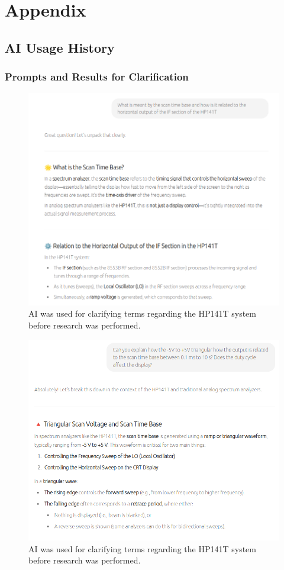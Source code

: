 \documentclass[class=report,11pt,crop=false]{standalone}
\begin{document}
	\chapter{Appendix}

	\section{AI Usage History}
	
	\subsection{Prompts and Results for Clarification}
	
	\begin{figure}[ht!]
		\centering
		\includegraphics[width=0.50\linewidth]{Figures/Appendices/clarification}
		\caption{AI was used for clarifying terms regarding the HP141T system before research was performed.}
		\label{fig:prompts-clarification}
	\end{figure} 

	\begin{figure}[ht!]
		\centering
		\includegraphics[width=0.50\linewidth]{Figures/Appendices/clarification-2}
		\caption{AI was used for clarifying terms regarding the HP141T system before research was performed.}
		\label{fig:prompts-clarification-2}
	\end{figure} 
	\clearpage
\end{document}

